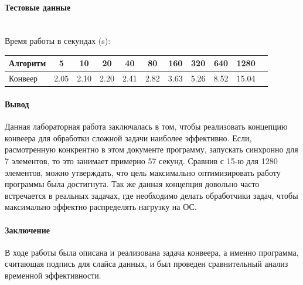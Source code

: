 \documentclass[utf8x, 12pt]{G7-32} %
\begin{document}
\newpage

\begin{flushleft}
\end{flushleft}

\paragraph{Тестовые данные}\\

Время работы в секундах (s):\\
\begin{tabular}{l*{9}{c}r}
	Алгоритм & 5 & 10 & 20 & 40 & 80 & 160 & 320 & 640 & 1280 \\
	\hline
	Конвеер & 2.05 & 2.10 & 2.20 & 2.41 & 2.82 & 3.63 & 5.26 & 8.52 & 15.04 \\
\end{tabular}

\newpage

\paragraph{Вывод}

Данная лабораторная работа заключалась в том, чтобы реализовать концепцию конвеера для обработки сложной задачи наиболее эффективно. Если, расмотренную конкрентно в этом документе программу, запускать синхронно для 7 элементов, то это занимает примерно 57 секунд. Сравнив с 15-ю для 1280 элементов, можно утверждать, что цель максимально оптимизировать работу программы была достигнута. Так же данная концепция довольно часто встречается в реальных задачах, где необходимо делать обработчики задач, чтобы максимально эффектно распределять нагрузку на ОС.

\paragraph{Заключение}

В ходе работы была описана и реализована задача конвеера, а именно программа, считающая подпись для слайса данных, и был проведен сравнительный анализ временной эффективности.

\backmatter %

\appendix   %
\end{document}
